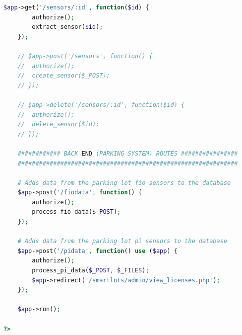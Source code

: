 \documentclass[11pt, oneside, fullpage, doublespace]{article}
\begin{document}
\begin{spacing}{1}
\begin{lstlisting}[language=php]
	$app->get('/sensors/:id', function($id) {
		authorize();
		extract_sensor($id);
	});

	// $app->post('/sensors', function() {
	// 	authorize();
	// 	create_sensor($_POST);
	// });

	// $app->delete('/sensors/:id', function($id) {
	// 	authorize();
	// 	delete_sensor($id);
	// });

	############ BACK END (PARKING SYSTEM) ROUTES ################
	##############################################################

	# Adds data from the parking lot fio sensors to the database
	$app->post('/fiodata', function() {
		authorize();
		process_fio_data($_POST);
	});

	# Adds data from the parking lot pi sensors to the database
	$app->post('/pidata', function() use ($app) {
		authorize();
		process_pi_data($_POST, $_FILES);
		$app->redirect('/smartlots/admin/view_licenses.php');
	});

	$app->run();

?>
\end{lstlisting}
\end{spacing}
\end{document}
